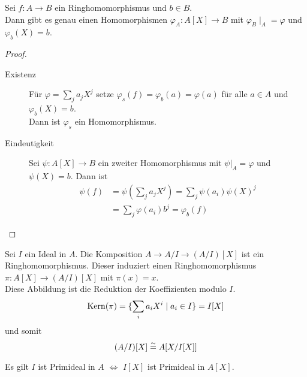 	\begin{satz}
		Sei $f:A\to B$ ein Ringhomomorphismus und $b\in B$. \\
		Dann gibt es genau einen Homomorphismen $\varphi_A:A[X]\to B$ mit $\varphi_B\mid_A=\varphi$ und $\varphi_b(X)=b$.
	\end{satz}

	\begin{proof}
		\begin{description}
			\item[Existenz] Für $\varphi=\sum_j a_jX^j$ setze $\varphi_s(f)=\varphi_b(a)=\varphi(a)$ für alle $a\in A$ und $\varphi_b(X)=b$.\\
			Dann ist $\varphi_s$ ein Homomorphismus.
			\item[Eindeutigkeit] Sei $\psi:A[X]\to B$ ein zweiter Homomorphismus mit $\psi|_A=\varphi$ und $\psi(X)=b$. Dann ist
			\begin{align*}
			\psi(f)&=\psi\left(\sum_ja_jX^j\right)=\sum_j\psi(a_i)\psi(X)^j\\
			&=\sum_j\varphi(a_i)b^j=\varphi_b(f)
			\end{align*}
		\end{description}
	\end{proof}
	
	\begin{exm}
		Sei $I$ ein Ideal in $A$. Die Komposition $A\to A/I\to(A/I)[X]$ ist ein Ringhomomorphismus. Dieser induziert einen Ringhomomorphismus $\pi:A[X]\to(A/I)[X]$ mit $\pi(x)=x$.\\
		Diese Abbildung ist die Reduktion der Koeffizienten modulo $I$.
		\[\operatorname{Kern}(\pi)=\{\sum_ia_iX^i\mid a_i\in I\}=I[X]\]
		und somit
		\[(A/I)[X]\overset{\sim}{=} A[X/I[X]]\]
	\end{exm}

	\begin{lem}
		Es gilt $I$ ist Primideal in $A$ $\Leftrightarrow$ $I[X]$ ist Primideal in $A[X]$.
	\end{lem}

